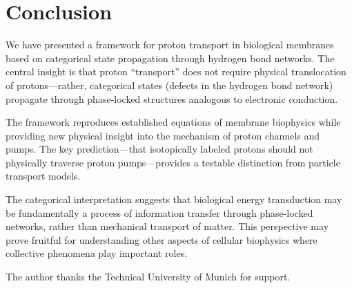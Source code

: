 \documentclass[twocolumn,showpacs,preprintnumbers,amsmath,amssymb,prd]{revtex4-2}
\begin{document}
\section{Conclusion}

We have presented a framework for proton transport in biological membranes based on categorical state propagation through hydrogen bond networks. The central insight is that proton ``transport'' does not require physical translocation of protons---rather, categorical states (defects in the hydrogen bond network) propagate through phase-locked structures analogous to electronic conduction.

The framework reproduces established equations of membrane biophysics while providing new physical insight into the mechanism of proton channels and pumps. The key prediction---that isotopically labeled protons should not physically traverse proton pumps---provides a testable distinction from particle transport models.

The categorical interpretation suggests that biological energy transduction may be fundamentally a process of information transfer through phase-locked networks, rather than mechanical transport of matter. This perspective may prove fruitful for understanding other aspects of cellular biophysics where collective phenomena play important roles.

\begin{acknowledgments}
The author thanks the Technical University of Munich for support.
\end{acknowledgments}


\end{document}
